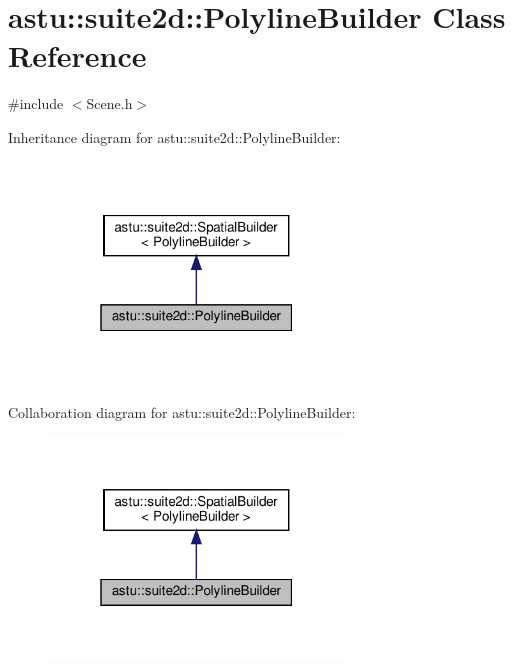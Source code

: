 \hypertarget{classastu_1_1suite2d_1_1PolylineBuilder}{}\section{astu\+:\+:suite2d\+:\+:Polyline\+Builder Class Reference}
\label{classastu_1_1suite2d_1_1PolylineBuilder}


{\ttfamily \#include $<$Scene.\+h$>$}



Inheritance diagram for astu\+:\+:suite2d\+:\+:Polyline\+Builder\+:\nopagebreak
\begin{figure}[H]
\begin{center}
\leavevmode
\includegraphics[width=223pt]{classastu_1_1suite2d_1_1PolylineBuilder__inherit__graph}
\end{center}
\end{figure}


Collaboration diagram for astu\+:\+:suite2d\+:\+:Polyline\+Builder\+:\nopagebreak
\begin{figure}[H]
\begin{center}
\leavevmode
\includegraphics[width=223pt]{classastu_1_1suite2d_1_1PolylineBuilder__coll__graph}
\end{center}
\end{figure}
